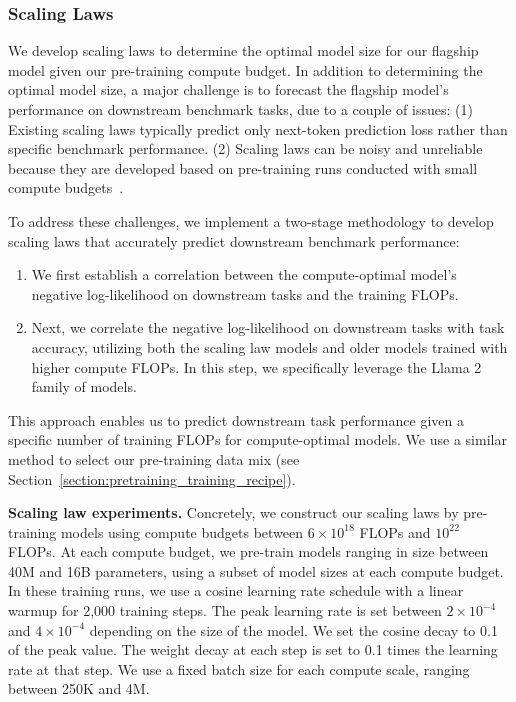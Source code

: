 \subsubsection{Scaling Laws}
\label{section:scaling_law}

We develop scaling laws \citep{hoffmann2022chinchilla,kaplan2020scaling} to determine the optimal model size for our flagship model given our pre-training compute budget. In addition to determining the optimal model size, a major challenge is to forecast the flagship model's performance on downstream benchmark tasks, due to a couple of issues: (1) Existing scaling laws typically predict only next-token prediction loss rather than specific benchmark performance. (2)  Scaling laws can be noisy and unreliable because they are developed based on pre-training runs conducted with small compute budgets~\citep{wei2022emergent}.

To address these challenges, we implement a two-stage methodology to develop scaling laws that accurately predict downstream benchmark performance:

\begin{enumerate}
    \item We first establish a correlation between the compute-optimal model's negative log-likelihood on downstream tasks and the training FLOPs.
    \item Next, we correlate the negative log-likelihood on downstream tasks with task accuracy, utilizing both the scaling law models and older models trained with higher compute FLOPs. In this step, we specifically leverage the Llama 2 family of models.
\end{enumerate}

This approach enables us to predict downstream task performance given a specific number of training FLOPs for compute-optimal models. We use a similar method to select our pre-training data mix (see Section~\ref{section:pretraining_training_recipe}).

\textbf{Scaling law experiments.} Concretely, we construct our scaling laws by pre-training models using compute budgets between $6 \times 10^{18}$ FLOPs and $10^{22}$ FLOPs. At each compute budget, we pre-train models ranging in size between 40M and 16B parameters, using a subset of model sizes at each compute budget. In these training runs, we use a cosine learning rate schedule with a linear warmup for 2,000 training steps. The peak learning rate is set between $2 \times 10^{-4}$ and $4 \times 10^{-4}$ depending on the size of the model. We set the cosine decay to 0.1 of the peak value. The weight decay at each step is set to 0.1 times the learning rate at that step. We use a fixed batch size for each compute scale, ranging between 250K and 4M.

